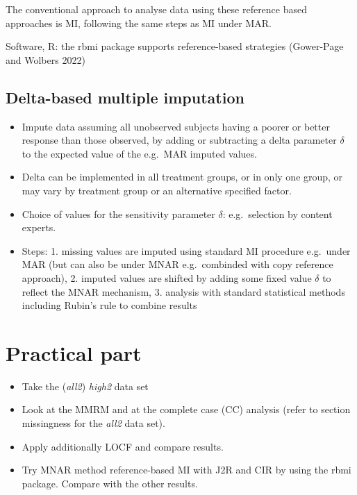 \documentclass[
  letterpaper,
  DIV=11,
  numbers=noendperiod]{scrreprt}
\providecommand{\tightlist}{%
  \setlength{\itemsep}{0pt}\setlength{\parskip}{0pt}}\usepackage{longtable,booktabs,array}
\begin{document}
The conventional approach to analyse data using these reference based
approaches is MI, following the same steps as MI under MAR.

Software, R: the rbmi package supports reference-based strategies
(Gower-Page and Wolbers 2022)

\hypertarget{delta-based-multiple-imputation}{%
\subsection{Delta-based multiple
imputation}\label{delta-based-multiple-imputation}}

\begin{itemize}
\tightlist
\item
  Impute data assuming all unobserved subjects having a poorer or better
  response than those observed, by adding or subtracting a delta
  parameter \(\delta\) to the expected value of the e.g.~MAR imputed
  values.
\item
  Delta can be implemented in all treatment groups, or in only one
  group, or may vary by treatment group or an alternative specified
  factor.
\item
  Choice of values for the sensitivity parameter \(\delta\):
  e.g.~selection by content experts.
\item
  Steps: 1. missing values are imputed using standard MI procedure
  e.g.~under MAR (but can also be under MNAR e.g.~combinded with copy
  reference approach), 2. imputed values are shifted by adding some
  fixed value \(\delta\) to reflect the MNAR mechanism, 3. analysis with
  standard statistical methods including Rubin's rule to combine results
\end{itemize}

\hypertarget{practical-part}{%
\section{Practical part}\label{practical-part}}

\begin{itemize}
\tightlist
\item
  Take the (\emph{all2}) \emph{high2} data set
\item
  Look at the MMRM and at the complete case (CC) analysis (refer to
  section missingness for the \emph{all2} data set).
\item
  Apply additionally LOCF and compare results.
\item
  Try MNAR method reference-based MI with J2R and CIR by using the rbmi
  package. Compare with the other results.
\end{itemize}
\end{document}

